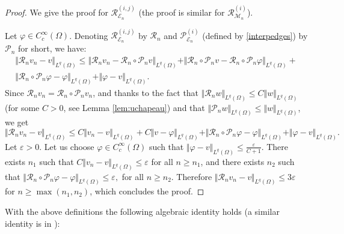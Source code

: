 \documentclass{amsart}
\numberwithin{equation}{section}
\begin{document}
\begin{proof}
 We give the proof for  $\mathcal R_{{{\mathcal E}}_n}^{(i,j)}$ (the proof is similar for  $\mathcal R_{{{\mathcal M}}_n}^{(i)}$).
 
 Let $\varphi \in C_c^\infty(\Omega)$. 
  Denoting $\mathcal R_{{{\mathcal E}}_n}^{(i,j)}$ by  $\mathcal R_n$ and $\mathcal P_{{{\mathcal E}}_n}^{(i)}$ (defined by \eqref{interpedges}) by  $\mathcal P_n$ for short,  we have: 
  \begin{align*}
   \Vert \mathcal  R_n  v_n -  v \Vert_{L^q(\Omega)} \le 
   \Vert  \mathcal  R_n  v_n -\mathcal  R_n \circ \mathcal  P_n v \Vert_{L^q(\Omega)} +
   \Vert   \mathcal  R_n \circ \mathcal P_n v - \mathcal  R_n \circ \mathcal  P_n \varphi \Vert_{L^q(\Omega)} +
   \\
   \Vert  \mathcal  R_n \circ \mathcal P_n \varphi -    \varphi \Vert_{L^q(\Omega)} + \Vert  \mathcal  \varphi - v \Vert_{L^q(\Omega)}.
   \end{align*}
  Since $ \mathcal R_n  v_n = \mathcal R_n \circ \mathcal  P_n v_n$,  and thanks to the fact that
  $\Vert  \mathcal R_n w \Vert_{L^q(\Omega)} \le C \Vert w \Vert_{L^q(\Omega)}$ (for some $C>0$, see Lemma \ref{lem:uchapeau}) and that $\Vert \mathcal P_n w \Vert_{L^q(\Omega)} \le \Vert w \Vert_{L^q(\Omega)}$, we get
   \[ 
   \Vert \mathcal R_n  v_n -v \Vert_{L^q(\Omega)} \le 
   C \Vert v_n - v \Vert_{L^q(\Omega)} +
   C\Vert v - \varphi \Vert_{L^q(\Omega)} +
    \Vert \mathcal  R_n \circ \mathcal P_n \varphi - \varphi \Vert_{L^q(\Omega)} + \Vert  \mathcal  \varphi - v \Vert_{L^q(\Omega)}.
   \]
   Let $\varepsilon >0$. 
   Let us choose $\varphi \in C_c^\infty(\Omega)$ such that $\Vert \mathcal \varphi - v \Vert_{L^q(\Omega)} \le \frac \varepsilon {C+1}$. 
   There exists $n_1$ such that $C \Vert v_n -  v \Vert_{L^q(\Omega)} \le \varepsilon$ for all $n \ge n_1$, and there exists $n_2$ such that $\Vert  \mathcal  R_n \circ \mathcal P_n \varphi - \varphi \Vert_{L^q(\Omega)} \le \varepsilon,$ for all $n \ge n_2$.
   Therefore $\Vert \mathcal R_n  v_n - v \Vert_{L^q(\Omega)} \le 3 \varepsilon$ for $n \ge \max(n_1,n_2)$, which concludes the proof. 
\end{proof}

With the above definitions the following algebraic identity holds (a similar identity is in \cite{gastaldo2014consistent}):
\end{document}
